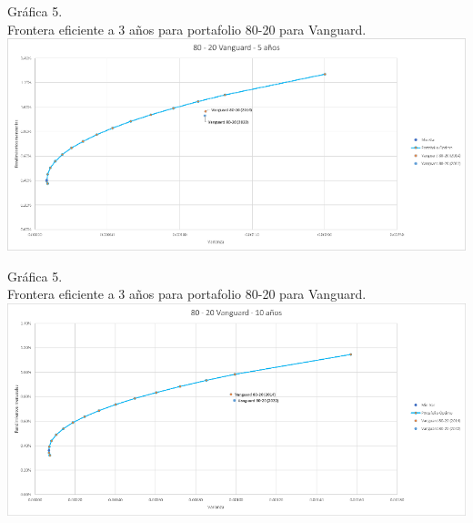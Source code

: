 \documentclass[a4paper,fleqn]{cas-sc}
\begin{document}
\begin{center}
    Gráfica 5.\\
    Frontera eficiente a 3 años para portafolio 80-20 para Vanguard.\\

    \includegraphics[scale=1.5]{image/imagen6.png}

\end{center}

\begin{center}
    Gráfica 5.\\
    Frontera eficiente a 3 años para portafolio 80-20 para Vanguard.\\

    \includegraphics[scale=1.2]{image/imagen7.png}

\end{center}

\newpage
\end{document}
